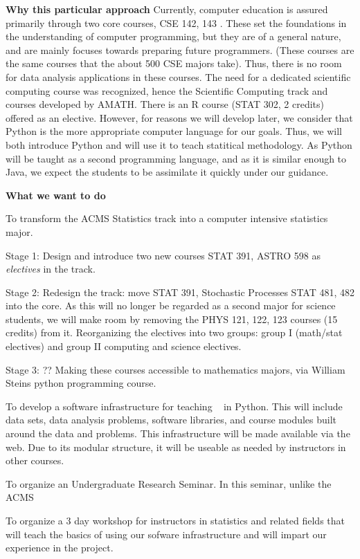 {\bf Why this particular approach} Currently, computer education is
assured primarily through two core courses, CSE 142, 143
\cite{cse142}. These set the foundations in the understanding of
computer programming, but they are of a general nature, and are mainly
focuses towards preparing future programmers. (These courses are the
same courses that the about 500 CSE majors take). Thus, there is no
room for data analysis applications in these courses. The need for a
dedicated scientific computing course was recognized, hence the
Scientific Computing track and courses developed by AMATH. There is an
R course (STAT 302, 2 credits) offered as an elective. However, for
reasons we will develop later, we consider that Python is the more
appropriate computer language for our goals. Thus, we will both
introduce Python and will use it to teach statitical methodology. As
Python will be taught as a second programming language, and as it is
similar enough to Java, we expect the students to be assimilate it
quickly under our guidance. 


{\bf What we want to do}

\bit
\item To transform the ACMS Statistics track into a computer intensive statistics major. 
  \bit
   \item Stage 1: Design and introduce two new courses STAT 391, ASTRO 598 as {\em electives} in the track.
   \item Stage 2: Redesign the track: move STAT 391, Stochastic Processes STAT 481, 482 into the core. As this will no longer be regarded as a second major for science students, we will make room by removing the PHYS 121, 122, 123 courses (15 credits) from it. Reorganizing the electives into two groups: group I (math/stat electives) and group II computing and science electives. 
   \item Stage 3: ?? Making these courses accessible to mathematics majors, via William Steins python programming course. 
  \eit
\item To develop a software infrastructure for teaching \cdse~ in
  Python. This will include data sets, data analysis problems,
  software libraries, and course modules built around the data and
  problems. This infrastructure will be made available via the
  web. Due to its modular structure, it will be useable as needed by
  instructors in other courses.
\item To organize an Undergraduate Research Seminar. In this seminar, unlike the ACMS 
\item To organize a 3 day workshop for instructors in statistics and related fields that will teach the basics of using our sofware infrastructure and will impart our experience in the project.
\eit



